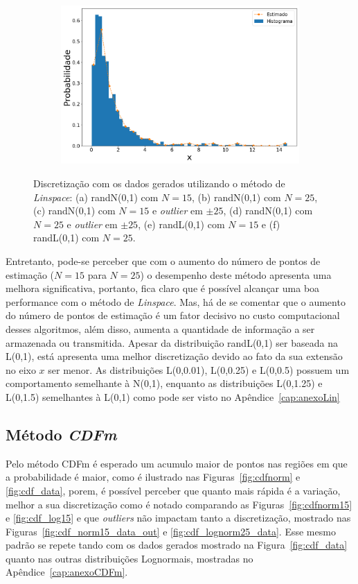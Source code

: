 \begin{figure}[H]
\begin{subfigure}[b]{0.45\textwidth}
		\includegraphics[width=\linewidth]{./figuras/Linspace_lognormal_25_1000}
		\caption{}
		\label{fig:lin_lognorm25_data}
	\end{subfigure}
	\caption{Discretização com os dados gerados utilizando o método de \textit{Linspace}: (a) randN(0,1) com $N = 15$, (b) randN(0,1) com $N = 25$, (c) randN(0,1) com $N = 15$ e \textit{outlier} em $\pm 25$, (d) randN(0,1) com $N = 25$ e \textit{outlier} em $\pm 25$, (e) randL(0,1) com $ N = 15 $ e (f) randL(0,1) com $ N = 25 $.}
	\label{fig:lin_data}
\end{figure}

Entretanto, pode-se perceber que com o aumento do número de pontos de estimação ($N = 15$ para $N = 25$) o desempenho deste método apresenta uma melhora significativa, portanto, fica claro que é possível alcançar uma boa performance com o método de \textit{Linspace}. Mas, há de se comentar que o aumento do número de pontos de estimação é um fator decisivo no custo computacional desses algoritmos, além disso, aumenta a quantidade de informação a ser armazenada ou transmitida. Apesar da distribuição randL(0,1) ser baseada na L(0,1), está apresenta uma melhor discretização devido ao fato da sua extensão no eixo $ x $ ser menor. As distribuições L(0,0.01), L(0,0.25) e L(0,0.5) possuem um comportamento semelhante à N(0,1), enquanto as distribuições L(0,1.25) e L(0,1.5) semelhantes à L(0,1) como pode ser visto no Apêndice~\ref{cap:anexoLin}

\subsection{Método \textit{CDFm}}

Pelo método \ac{CDFm} é esperado um acumulo maior de pontos nas regiões em que a probabilidade é maior, como é ilustrado nas Figuras~\ref{fig:cdfnorm} e \ref{fig:cdf_data}, porem, é possível perceber que quanto mais rápida é a variação, melhor a sua discretização como é notado comparando as Figuras~\ref{fig:cdfnorm15} e \ref{fig:cdf_log15} e que \textit{outliers} não impactam tanto a discretização, mostrado nas Figuras~\ref{fig:cdf_norm15_data_out} e \ref{fig:cdf_lognorm25_data}. Esse mesmo padrão se repete tando com os dados gerados mostrado na Figura~\ref{fig:cdf_data} quanto nas outras distribuições Lognormais, mostradas no Apêndice~\ref{cap:anexoCDFm}.

